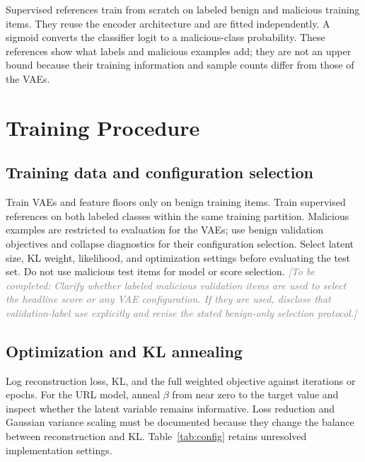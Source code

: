 \documentclass{article}
\newcommand{\pending}[1]{\textcolor{gray}{\textit{[To be completed: #1]}}}
\begin{document}
Supervised references train from scratch on labeled benign and malicious training items.
They reuse the encoder architecture and are fitted independently.
A sigmoid converts the classifier logit to a malicious-class probability.
These references show what labels and malicious examples add; they are not an upper bound because their training information and sample counts differ from those of the VAEs.

\section{Training Procedure}

\subsection{Training data and configuration selection}
Train VAEs and feature floors only on benign training items.
Train supervised references on both labeled classes within the same training partition.
Malicious examples are restricted to evaluation for the VAEs; use benign validation objectives and collapse diagnostics for their configuration selection.
Select latent size, KL weight, likelihood, and optimization settings before evaluating the test set.
Do not use malicious test items for model or score selection.
\pending{Clarify whether labeled malicious validation items are used to select the headline score or any VAE configuration. If they are used, disclose that validation-label use explicitly and revise the stated benign-only selection protocol.}

\subsection{Optimization and KL annealing}
Log reconstruction loss, KL, and the full weighted objective against iterations or epochs.
For the URL model, anneal $\beta$ from near zero to the target value and inspect whether the latent variable remains informative.
Loss reduction and Gaussian variance scaling must be documented because they change the balance between reconstruction and KL.
Table~\ref{tab:config} retains unresolved implementation settings.
\end{document}

